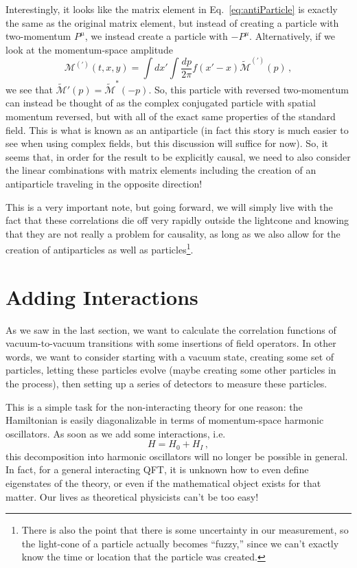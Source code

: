 \documentclass{article}
\numberwithin{equation}{subsection}
\begin{document}
Interestingly, it looks like the matrix element in Eq.~\eqref{eq:antiParticle} is exactly the same as the original matrix element, but instead of creating a particle with 
two-momentum $P^\mu$, we instead create a particle with $-P^\mu$. Alternatively, if we look at the momentum-space amplitude
\begin{equation}
    \mathcal{M}^{(\prime)}(t, x, y) = \int dx'\int\frac{dp}{2\pi}f(x' - x)\tilde{\mathcal{M}}^{(\prime)}(p)\,,
\end{equation}
we see that $\tilde{\mathcal{M}}'(p) = \tilde{\mathcal{M}}^*(-p)$. So, this particle with reversed two-momentum can instead be thought of as the complex conjugated 
particle with spatial momentum reversed, but with all of the exact same properties of the standard field. This is what is known as an antiparticle (in fact this story 
is much easier to see when using complex fields, but this discussion will suffice for now). So, it seems that, in order for the result to be explicitly causal, 
we need to also consider the linear combinations with matrix elements including the creation of an antiparticle
traveling in the opposite direction!

This is a very important note, but going forward, we will simply live with the fact that these correlations die off very rapidly outside the lightcone and knowing that they 
are not really a problem for causality, as long as we also allow for the creation of antiparticles as well as
particles\footnote{There is also the point that there is some uncertainty in our measurement, so the light-cone of a
particle actually becomes ``fuzzy,'' since we can't exactly know the time or location that the particle was created.}.

\section{Adding Interactions}

As we saw in the last section, we want to calculate the correlation functions of vacuum-to-vacuum transitions with some insertions of field operators. In other words, 
we want to consider starting with a vacuum state, creating some set of particles, letting these particles evolve (maybe creating some other particles in the process), then 
setting up a series of detectors to measure these particles.

This is a simple task for the non-interacting theory for one reason: the Hamiltonian is easily diagonalizable in terms of momentum-space harmonic oscillators. As soon as we add some interactions, i.e.
\begin{equation}
    H = H_0 + H_I\,,
\end{equation}
this decomposition into harmonic oscillators will no longer be possible in general. In fact, for a general interacting QFT, it is unknown how to even define eigenstates 
of the theory, or even if the mathematical object exists for that matter. Our lives as theoretical physicists can't be too easy!
\end{document}
